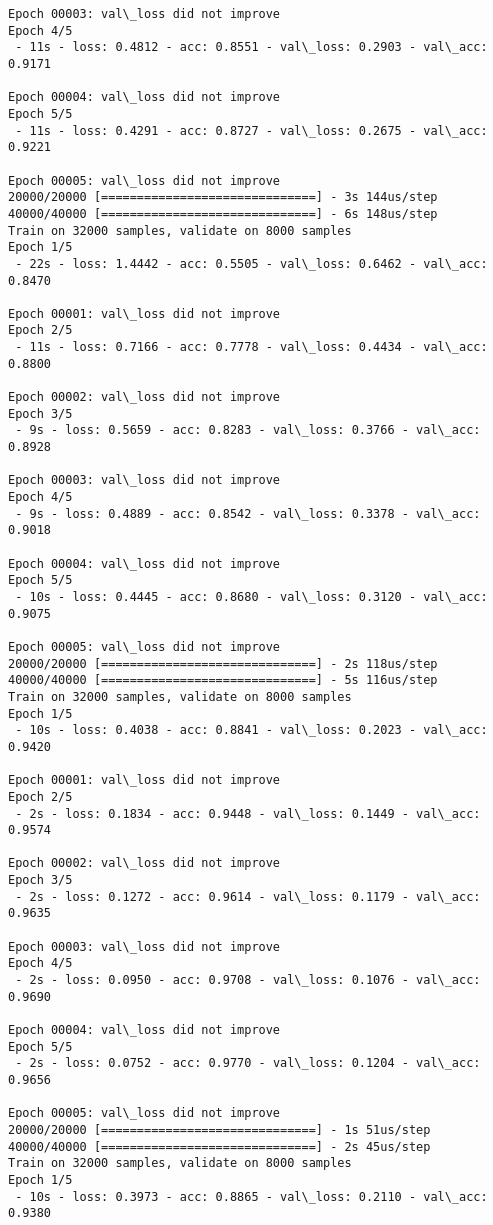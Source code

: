 \documentclass[11pt]{article}
\begin{document}
\begin{Verbatim}[commandchars=\\\{\}]
Epoch 00003: val\_loss did not improve
Epoch 4/5
 - 11s - loss: 0.4812 - acc: 0.8551 - val\_loss: 0.2903 - val\_acc: 0.9171

Epoch 00004: val\_loss did not improve
Epoch 5/5
 - 11s - loss: 0.4291 - acc: 0.8727 - val\_loss: 0.2675 - val\_acc: 0.9221

Epoch 00005: val\_loss did not improve
20000/20000 [==============================] - 3s 144us/step
40000/40000 [==============================] - 6s 148us/step
Train on 32000 samples, validate on 8000 samples
Epoch 1/5
 - 22s - loss: 1.4442 - acc: 0.5505 - val\_loss: 0.6462 - val\_acc: 0.8470

Epoch 00001: val\_loss did not improve
Epoch 2/5
 - 11s - loss: 0.7166 - acc: 0.7778 - val\_loss: 0.4434 - val\_acc: 0.8800

Epoch 00002: val\_loss did not improve
Epoch 3/5
 - 9s - loss: 0.5659 - acc: 0.8283 - val\_loss: 0.3766 - val\_acc: 0.8928

Epoch 00003: val\_loss did not improve
Epoch 4/5
 - 9s - loss: 0.4889 - acc: 0.8542 - val\_loss: 0.3378 - val\_acc: 0.9018

Epoch 00004: val\_loss did not improve
Epoch 5/5
 - 10s - loss: 0.4445 - acc: 0.8680 - val\_loss: 0.3120 - val\_acc: 0.9075

Epoch 00005: val\_loss did not improve
20000/20000 [==============================] - 2s 118us/step
40000/40000 [==============================] - 5s 116us/step
Train on 32000 samples, validate on 8000 samples
Epoch 1/5
 - 10s - loss: 0.4038 - acc: 0.8841 - val\_loss: 0.2023 - val\_acc: 0.9420

Epoch 00001: val\_loss did not improve
Epoch 2/5
 - 2s - loss: 0.1834 - acc: 0.9448 - val\_loss: 0.1449 - val\_acc: 0.9574

Epoch 00002: val\_loss did not improve
Epoch 3/5
 - 2s - loss: 0.1272 - acc: 0.9614 - val\_loss: 0.1179 - val\_acc: 0.9635

Epoch 00003: val\_loss did not improve
Epoch 4/5
 - 2s - loss: 0.0950 - acc: 0.9708 - val\_loss: 0.1076 - val\_acc: 0.9690

Epoch 00004: val\_loss did not improve
Epoch 5/5
 - 2s - loss: 0.0752 - acc: 0.9770 - val\_loss: 0.1204 - val\_acc: 0.9656

Epoch 00005: val\_loss did not improve
20000/20000 [==============================] - 1s 51us/step
40000/40000 [==============================] - 2s 45us/step
Train on 32000 samples, validate on 8000 samples
Epoch 1/5
 - 10s - loss: 0.3973 - acc: 0.8865 - val\_loss: 0.2110 - val\_acc: 0.9380


\end{Verbatim}
\end{document}
